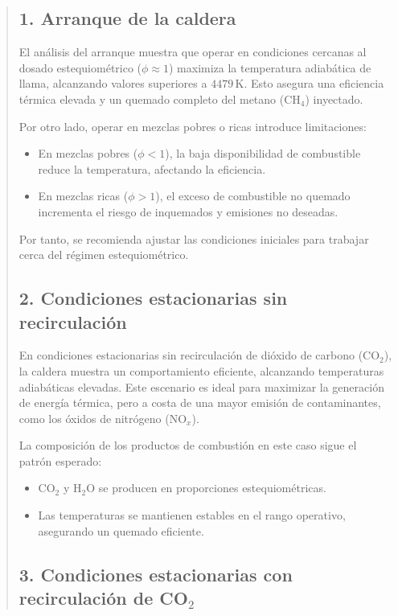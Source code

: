 \documentclass[11pt, a4paper]{article}
\begin{document}
\begin{quote}
\begin{center}
\begin{adjustwidth}{-1.7cm}{-1cm}
\subsection*{1. Arranque de la caldera}

El análisis del arranque muestra que operar en condiciones cercanas al dosado estequiométrico (\(\phi \approx 1\)) maximiza la temperatura adiabática de llama, alcanzando valores superiores a \(4479 \, \text{K}\). Esto asegura una eficiencia térmica elevada y un quemado completo del metano (\(\text{CH}_4\)) inyectado. 

Por otro lado, operar en mezclas pobres o ricas introduce limitaciones:
\begin{itemize}
    \item En mezclas pobres (\(\phi < 1\)), la baja disponibilidad de combustible reduce la temperatura, afectando la eficiencia.
    \item En mezclas ricas (\(\phi > 1\)), el exceso de combustible no quemado incrementa el riesgo de inquemados y emisiones no deseadas.
\end{itemize}
Por tanto, se recomienda ajustar las condiciones iniciales para trabajar cerca del régimen estequiométrico.

\subsection*{2. Condiciones estacionarias sin recirculación}

En condiciones estacionarias sin recirculación de dióxido de carbono (\(\text{CO}_2\)), la caldera muestra un comportamiento eficiente, alcanzando temperaturas adiabáticas elevadas. Este escenario es ideal para maximizar la generación de energía térmica, pero a costa de una mayor emisión de contaminantes, como los óxidos de nitrógeno (\(\text{NO}_x\)).

La composición de los productos de combustión en este caso sigue el patrón esperado:
\begin{itemize}
    \item \(\text{CO}_2\) y \(\text{H}_2\text{O}\) se producen en proporciones estequiométricas.
    \item Las temperaturas se mantienen estables en el rango operativo, asegurando un quemado eficiente.
\end{itemize}
\newpage
\subsection*{3. Condiciones estacionarias con recirculación de CO$_2$}


\end{adjustwidth}
\end{center}
\end{quote}
\end{document}
